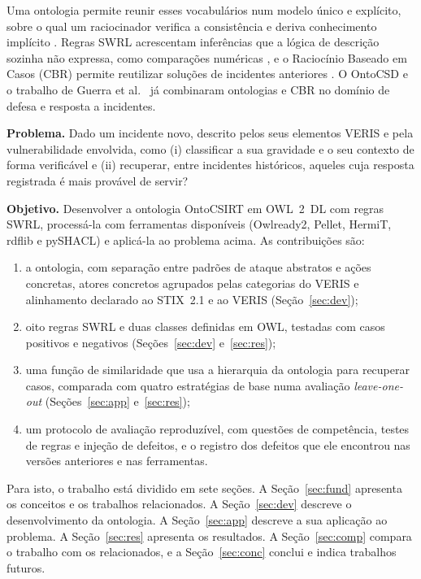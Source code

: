 \documentclass[12pt]{article}
\begin{document}
Uma ontologia permite reunir esses vocabulários num modelo único e explícito, sobre o qual um raciocinador verifica a consistência e deriva conhecimento implícito \cite{owl2}. Regras SWRL acrescentam inferências que a lógica de descrição sozinha não expressa, como comparações numéricas \cite{swrl}, e o Raciocínio Baseado em Casos (CBR) permite reutilizar soluções de incidentes anteriores \cite{aamodt1994}. O OntoCSD \cite{wu2024ontocsd} e o trabalho de Guerra et al.\ \cite{guerra2023} já combinaram ontologias e CBR no domínio de defesa e resposta a incidentes.

\textbf{Problema.} Dado um incidente novo, descrito pelos seus elementos VERIS e pela vulnerabilidade envolvida, como (i) classificar a sua gravidade e o seu contexto de forma verificável e (ii) recuperar, entre incidentes históricos, aqueles cuja resposta registrada é mais provável de servir?

\textbf{Objetivo.} Desenvolver a ontologia OntoCSIRT em OWL~2~DL com regras SWRL, processá-la com ferramentas disponíveis (Owlready2, Pellet, HermiT, rdflib e pySHACL) e aplicá-la ao problema acima. As contribuições são:
\begin{enumerate}
\item a ontologia, com separação entre padrões de ataque abstratos e ações concretas, atores concretos agrupados pelas categorias do VERIS e alinhamento declarado ao STIX~2.1 e ao VERIS (Seção~\ref{sec:dev});
\item oito regras SWRL e duas classes definidas em OWL, testadas com casos positivos e negativos (Seções~\ref{sec:dev} e~\ref{sec:res});
\item uma função de similaridade que usa a hierarquia da ontologia para recuperar casos, comparada com quatro estratégias de base numa avaliação \emph{leave-one-out} (Seções~\ref{sec:app} e~\ref{sec:res});
\item um protocolo de avaliação reproduzível, com questões de competência, testes de regras e injeção de defeitos, e o registro dos defeitos que ele encontrou nas versões anteriores e nas ferramentas.
\end{enumerate}

Para isto, o trabalho está dividido em sete seções. A Seção~\ref{sec:fund} apresenta os conceitos e os trabalhos relacionados. A Seção~\ref{sec:dev} descreve o desenvolvimento da ontologia. A Seção~\ref{sec:app} descreve a sua aplicação ao problema. A Seção~\ref{sec:res} apresenta os resultados. A Seção~\ref{sec:comp} compara o trabalho com os relacionados, e a Seção~\ref{sec:conc} conclui e indica trabalhos futuros.
\end{document}
